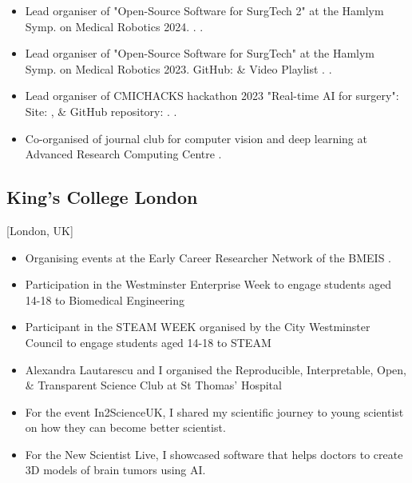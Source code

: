 \documentclass{mycv}
\begin{document}
\begin{itemize}
\item Lead organiser of "Open-Source Software for SurgTech 2" at the Hamlym Symp. on Medical Robotics 2024.
	\href{https://www.hamlynsymposium.org/events/open-source-software-for-surgical-technologies-2/}{\faExternalLink*}.
	.

\item Lead organiser of "Open-Source Software for SurgTech" at the Hamlym Symp. on Medical Robotics 2023. 
	GitHub: \href{https://github.com/oss-for-surgtech/workshop-hamlyn2023}{\faGithub*} \&
    Video Playlist \href{https://youtube.com/playlist?list=PLtGJkyfu0klZlvZkPyDLArhjs7i39C-ld&si=wmOQZ2Qr5_QDWrg3}{\faYoutube}.
	.

\item Lead organiser of CMICHACKS hackathon 2023 "Real-time AI for surgery": 
	Site: \href{https://cmic-ucl.github.io/CMICHACKS/edition2023/index.html}{\faExternalLink*}, \&
	GitHub repository: \href{https://github.com/SciKit-Surgery/cmicHACKS2}{\faGithub*}.
	.

\item Co-organised of journal club for computer vision and deep learning at Advanced Research Computing Centre 
	.

\end{itemize}

\subsection{King's College London}[London, UK]
\vspace{1mm}
\begin{positions}
\end{positions}
\begin{itemize}
	\item Organising events at the Early Career Researcher Network of the BMEIS .
	\item Participation in the Westminster Enterprise Week to engage students aged 14-18 to Biomedical Engineering 
	\item Participant in the STEAM WEEK organised by the City Westminster Council to engage students aged 14-18 to STEAM \href{https://twitter.com/_mxochicale/status/1374407825607200769}{\faTwitter} 
	\item Alexandra Lautarescu and I organised the Reproducible, Interpretable, Open, \& Transparent Science Club at St Thomas' Hospital 
	\item For the event In2ScienceUK, I shared my scientific journey to young scientist on how they can become better scientist.  
	\item For the New Scientist Live, I showcased software that helps doctors to create 3D models of brain tumors using AI. 
\end{itemize}
\end{document}

